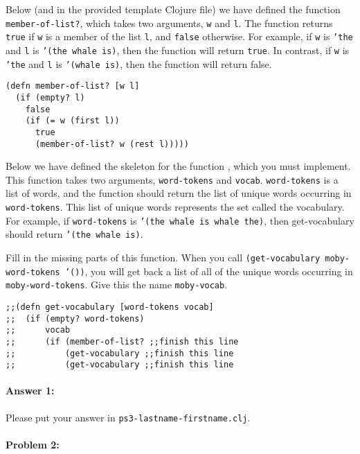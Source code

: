 \documentclass[10pt]{article}
\newcommand{\required}[1]{{\color{blue}{#1}}}
\newcommand{\PSnum}{3}
\begin{document}
Below (and in the provided template Clojure file) 
we have defined the function \texttt{member-of-list?}, which
takes two arguments, \texttt{w} and \texttt{l}. 
The function returns \texttt{true} if \texttt{w} is a member of the list
\texttt{l}, and \texttt{false} otherwise. For example, if \texttt{w}
is \texttt{'the} and \texttt{l} is \texttt{'(the whale is)}, 
then the function will return \texttt{true}. In contrast, if
\texttt{w} is \texttt{'the} and \texttt{l} is \texttt{'(whale is)},
then the function will return false.

\begin{lstlisting}
(defn member-of-list? [w l]
  (if (empty? l)
    false
    (if (= w (first l))
      true
      (member-of-list? w (rest l)))))
\end{lstlisting}

Below we have defined the skeleton for the function
\required{\texttt{get-vocabulary}}, which you must implement.
This function takes two arguments, \texttt{word-tokens} and \texttt{vocab}. 
\texttt{word-tokens} is a list of words, and the function should return 
the list of unique words occurring in \texttt{word-tokens}.
This list of unique words represents the set called the vocabulary. 
For example, if \texttt{word-tokens} is \texttt{'(the whale is whale the)},
then get-vocabulary should return \texttt{'(the whale is)}.

Fill in the missing parts of this function. When you call
\texttt{(get-vocabulary moby-word-tokens '())}, you will get back a
list of all of the unique words occurring in \texttt{moby-word-tokens}. Give
this the name \texttt{moby-vocab}.

\begin{lstlisting}
;;(defn get-vocabulary [word-tokens vocab]
;;  (if (empty? word-tokens)
;;      vocab
;;      (if (member-of-list? ;;finish this line
;;          (get-vocabulary ;;finish this line
;;          (get-vocabulary ;;finish this line
\end{lstlisting}

\paragraph{Answer 1:} Please put your answer in \texttt{ps\PSnum-lastname-firstname.clj}.

\noindent\hrulefill %

\paragraph{Problem 2:}
\end{document}

